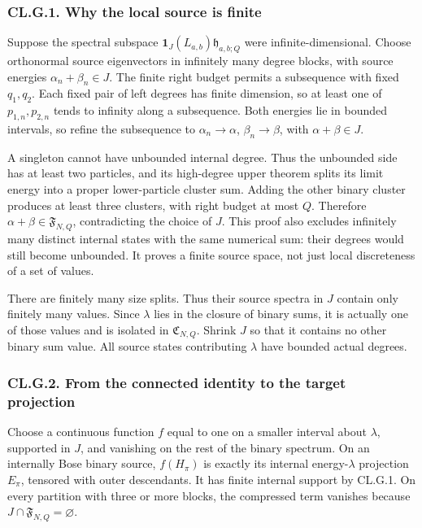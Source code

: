 \hypertarget{cl.g.1.-why-the-local-source-is-finite}{%
\subsubsection{CL.G.1. Why the local source is finite}\label{cl.g.1.-why-the-local-source-is-finite}}

Suppose the spectral subspace \(\mathbf1_J(L_{a,b})\mathfrak h_{a,b;Q}\) were infinite-dimensional. Choose orthonormal source eigenvectors in infinitely many degree blocks, with source energies \(\alpha_n+\beta_n\in J\). The finite right budget permits a subsequence with fixed \(q_1,q_2\). Each fixed pair of left degrees has finite dimension, so at least one of \(p_{1,n},p_{2,n}\) tends to infinity along a subsequence. Both energies lie in bounded intervals, so refine the subsequence to \(\alpha_n\to\alpha\), \(\beta_n\to\beta\), with \(\alpha+\beta\in J\).

A singleton cannot have unbounded internal degree. Thus the unbounded side has at least two particles, and its high-degree upper theorem splits its limit energy into a proper lower-particle cluster sum. Adding the other binary cluster produces at least three clusters, with right budget at most \(Q\). Therefore \(\alpha+\beta\in\mathfrak F_{N,Q}\), contradicting the choice of \(J\). This proof also excludes infinitely many distinct internal states with the same numerical sum: their degrees would still become unbounded. It proves a finite source space, not just local discreteness of a set of values.

There are finitely many size splits. Thus their source spectra in \(J\) contain only finitely many values. Since \(\lambda\) lies in the closure of binary sums, it is actually one of those values and is isolated in \(\mathfrak C_{N,Q}\). Shrink \(J\) so that it contains no other binary sum value. All source states contributing \(\lambda\) have bounded actual degrees.

\hypertarget{cl.g.2.-from-the-connected-identity-to-the-target-projection}{%
\subsubsection{CL.G.2. From the connected identity to the target projection}\label{cl.g.2.-from-the-connected-identity-to-the-target-projection}}

Choose a continuous function \(f\) equal to one on a smaller interval about \(\lambda\), supported in \(J\), and vanishing on the rest of the binary spectrum. On an internally Bose binary source, \(f(H_\pi)\) is exactly its internal energy-\(\lambda\) projection \(E_\pi\), tensored with outer descendants. It has finite internal support by CL.G.1. On every partition with three or more blocks, the compressed term vanishes because \(J\cap\mathfrak F_{N,Q}=\varnothing\).

